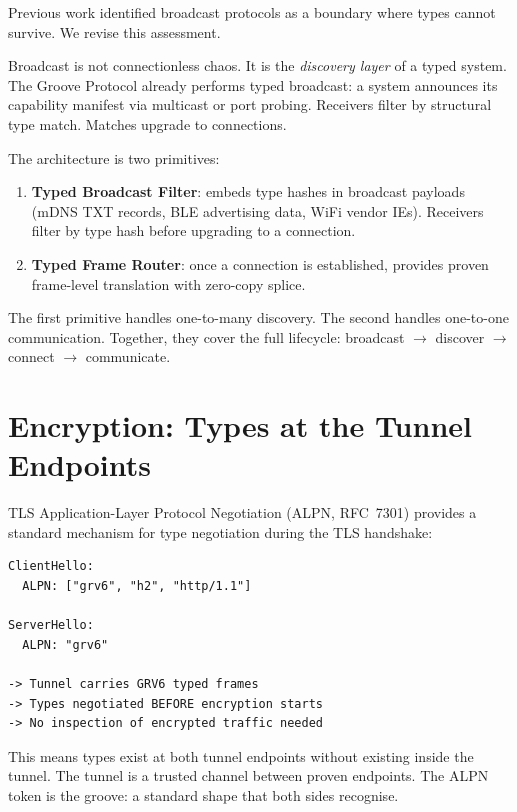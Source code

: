 \documentclass[11pt,a4paper]{article}
\begin{document}
Previous work \cite{boundaries2026} identified broadcast protocols as a
boundary where types cannot survive. We revise this assessment.

Broadcast is not connectionless chaos. It is the \emph{discovery layer}
of a typed system. The Groove Protocol already performs typed broadcast:
a system announces its capability manifest via multicast or port probing.
Receivers filter by structural type match. Matches upgrade to connections.

The architecture is two primitives:

\begin{enumerate}
\item \textbf{Typed Broadcast Filter}: embeds type hashes in broadcast
  payloads (mDNS TXT records, BLE advertising data, WiFi vendor IEs).
  Receivers filter by type hash before upgrading to a connection.

\item \textbf{Typed Frame Router}: once a connection is established,
  provides proven frame-level translation with zero-copy splice.
\end{enumerate}

The first primitive handles one-to-many discovery. The second handles
one-to-one communication. Together, they cover the full lifecycle:
broadcast $\rightarrow$ discover $\rightarrow$ connect $\rightarrow$
communicate.

\section{Encryption: Types at the Tunnel Endpoints}

TLS Application-Layer Protocol Negotiation (ALPN, RFC~7301) provides a
standard mechanism for type negotiation during the TLS handshake:

\begin{lstlisting}[caption={GRV6 ALPN negotiation}]
ClientHello:
  ALPN: ["grv6", "h2", "http/1.1"]

ServerHello:
  ALPN: "grv6"

-> Tunnel carries GRV6 typed frames
-> Types negotiated BEFORE encryption starts
-> No inspection of encrypted traffic needed
\end{lstlisting}

This means types exist at both tunnel endpoints without existing inside
the tunnel. The tunnel is a trusted channel between proven endpoints.
The ALPN token is the groove: a standard shape that both sides recognise.
\end{document}
